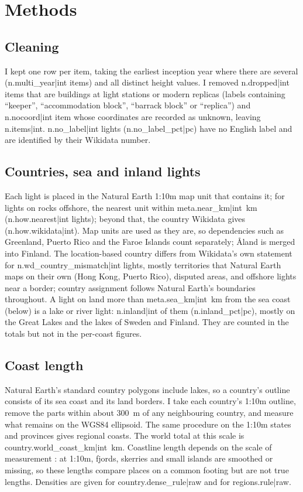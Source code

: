 \documentclass[11pt,a4paper]{article}
\begin{document}
\section{Methods}
\subsection{Cleaning}
I kept one row per item, taking the earliest inception year where there are several ({{n.multi_year|int}} items) and all distinct height values. I removed {{n.dropped|int}} items that are buildings at light stations or modern replicas (labels containing ``keeper'', ``accommodation block'', ``barrack block'' or ``replica'') and {{n.nocoord|int}} item whose coordinates are recorded as unknown, leaving {{n.items|int}}. {{n.no_label|int}} lights ({{n.no_label_pct|pc}}) have no English label and are identified by their Wikidata number.

\subsection{Countries, sea and inland lights}
Each light is placed in the Natural Earth 1:10m map unit that contains it; for lights on rocks offshore, the nearest unit within {{meta.near_km|int}}~km ({{n.how.nearest|int}} lights); beyond that, the country Wikidata gives ({{n.how.wikidata|int}}). Map units are used as they are, so dependencies such as Greenland, Puerto Rico and the Faroe Islands count separately; Åland is merged into Finland. The location-based country differs from Wikidata's own statement for {{n.wd_country_mismatch|int}} lights, mostly territories that Natural Earth maps on their own (Hong Kong, Puerto Rico), disputed areas, and offshore lights near a border; country assignment follows Natural Earth's boundaries throughout. A light on land more than {{meta.sea_km|int}}~km from the sea coast (below) is a lake or river light: {{n.inland|int}} of them ({{n.inland_pct|pc}}), mostly on the Great Lakes and the lakes of Sweden and Finland. They are counted in the totals but not in the per-coast figures.

\subsection{Coast length}
Natural Earth's standard country polygons include lakes, so a country's outline consists of its sea coast and its land borders. I take each country's 1:10m outline, remove the parts within about 300~m of any neighbouring country, and measure what remains on the WGS84 ellipsoid. The same procedure on the 1:10m states and provinces gives regional coasts. The world total at this scale is {{country.world_coast_km|int}}~km. Coastline length depends on the scale of measurement \citep{mandelbrot}: at 1:10m, fjords, skerries and small islands are smoothed or missing, so these lengths compare places on a common footing but are not true lengths. Densities are given for {{country.dense_rule|raw}} and for {{regions.rule|raw}}.
\end{document}
